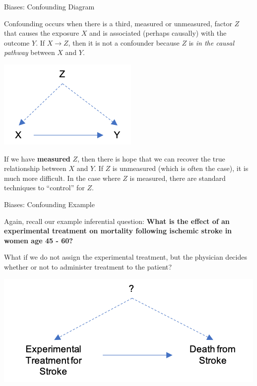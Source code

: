 \documentclass[ignorenonframetext,]{beamer}
\begin{document}
\begin{frame}{Biases: Confounding Diagram}
\protect\hypertarget{biases-confounding-diagram}{}

Confounding occurs when there is a third, measured or unmeasured, factor
\(Z\) that causes the exposure \(X\) and is associated (perhaps
causally) with the outcome \(Y\). If \(X \to Z\), then it is not a
confounder because \(Z\) is \emph{in the causal pathway} between \(X\)
and \(Y\).

\includegraphics{../media/confounding-basic.png}

If we have \textbf{measured} \(Z\), then there is hope that we can
recover the true relationship between \(X\) and \(Y\). If \(Z\) is
unmeasured (which is often the case), it is much more difficult. In the
case where \(Z\) is measured, there are standard techniques to
``control'' for \(Z\).

\end{frame}

\begin{frame}{Biases: Confounding Example}
\protect\hypertarget{biases-confounding-example}{}

Again, recall our example inferential question: \textbf{What is the
effect of an experimental treatment on mortality following ischemic
stroke in women age 45 - 60?}

What if we do not assign the experimental treatment, but the physician
decides whether or not to administer treatment to the patient?

\includegraphics{../media/confounding-example-q.png}

\end{frame}
\end{document}
